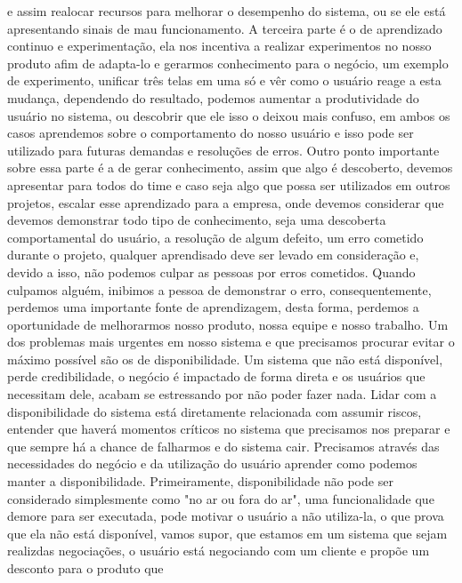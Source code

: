     e assim realocar recursos para melhorar o desempenho do sistema, ou se ele está
    apresentando sinais de mau funcionamento. A terceira parte é o de aprendizado
    continuo e experimentação, ela nos incentiva a realizar experimentos no nosso
    produto afim de adapta-lo e gerarmos conhecimento para o negócio, um exemplo de
    experimento, unificar três telas em uma só e vêr como o usuário reage a esta
    mudança, dependendo do resultado, podemos aumentar a produtividade do usuário
    no sistema, ou descobrir que ele isso o deixou mais confuso, em ambos os casos
    aprendemos sobre o comportamento do nosso usuário e isso pode ser utilizado para
    futuras demandas e resoluções de erros. Outro ponto importante sobre essa parte
    é a de gerar conhecimento, assim que algo é descoberto, devemos apresentar para
    todos do time e caso seja algo que possa ser utilizados em outros projetos,
    escalar esse aprendizado para a empresa, onde devemos considerar que devemos
    demonstrar todo tipo de conhecimento, seja uma descoberta comportamental do usuário,
    a resolução de algum defeito, um erro cometido durante o projeto, qualquer
    aprendisado deve ser levado em consideração e, devido a isso, não podemos culpar
    as pessoas por erros cometidos. Quando culpamos alguém, inibimos a pessoa de
    demonstrar o erro, consequentemente, perdemos uma importante fonte de aprendizagem,
    desta forma, perdemos a oportunidade de melhorarmos nosso produto, nossa equipe
    e nosso trabalho. \newline
    Um dos problemas mais urgentes em nosso sistema e que precisamos procurar evitar
    o máximo possível são os de disponibilidade. Um sistema que não está disponível,
    perde credibilidade, o negócio é impactado de forma direta e os usuários que
    necessitam dele, acabam se estressando por não poder fazer nada. Lidar com a
    disponibilidade do sistema está diretamente relacionada com assumir riscos,
    entender que haverá momentos críticos no sistema que precisamos nos preparar e
    que sempre há a chance de falharmos e do sistema cair. Precisamos através das
    necessidades do negócio e da utilização do usuário aprender como podemos manter
    a disponibilidade. Primeiramente, disponibilidade não pode ser considerado
    simplesmente como "no ar ou fora do ar", uma funcionalidade que demore para ser
    executada, pode motivar o usuário a não utiliza-la, o que prova que ela não está
    disponível, vamos supor, que estamos em um sistema que sejam realizdas negociações,
    o usuário está negociando com um cliente e propõe um desconto para o produto que
